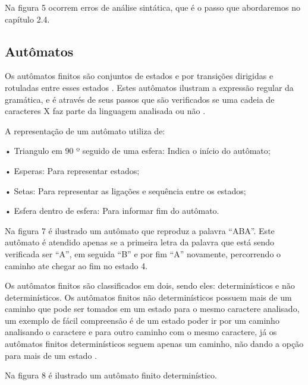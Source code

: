 \documentclass[12pt,oneside,a4paper,chapter=TITLE,section=TITLE,sumario=tradicional]{abntex2}
\begin{document}
Na figura 5 ocorrem erros de análise sintática, que é o passo que abordaremos no capítulo 2.4.

\subsection{Autômatos}
\label{sec:automatos}

Os autômatos finitos são conjuntos de estados e por transições dirigidas e rotuladas entre esses estados \cite{pedro2018}. Estes autômatos ilustram a expressão regular da gramática, e é através de seus passos que são verificados se uma cadeia de caracteres X faz parte da linguagem analisada ou não \cite{alfred1995}.

A representação de um autômato utiliza de:

•	Triangulo em 90 º seguido de uma esfera: Indica o início do autômato;

•	Esperas: Para representar estados;

•	Setas: Para representar as ligações e sequência entre os estados;

•	Esfera dentro de esfera: Para informar fim do autômato.

Na figura 7 é ilustrado um autômato que reproduz a palavra “ABA”. Este autômato é atendido apenas se a primeira letra da palavra que está sendo verificada ser “A”, em seguida “B” e por fim “A” novamente, percorrendo o caminho ate chegar ao fim no estado 4.

\begin{figure}[htb]
\end{figure}

Os autômatos finitos são classificados em dois, sendo eles: determinísticos e não determinísticos. Os autômatos finitos não determinísticos possuem mais de um caminho que pode ser tomados em um estado para o mesmo caractere analisado, um exemplo de fácil compreensão é de um estado poder ir por um caminho analisando o caractere e para outro caminho com o mesmo caractere, já os autômatos finitos determinísticos seguem apenas um caminho, não dando a opção para mais de um estado \cite{alfred1995}.

Na figura 8 é ilustrado um autômato finito determinístico.

\begin{figure}[H]
\end{figure}
\end{document}
